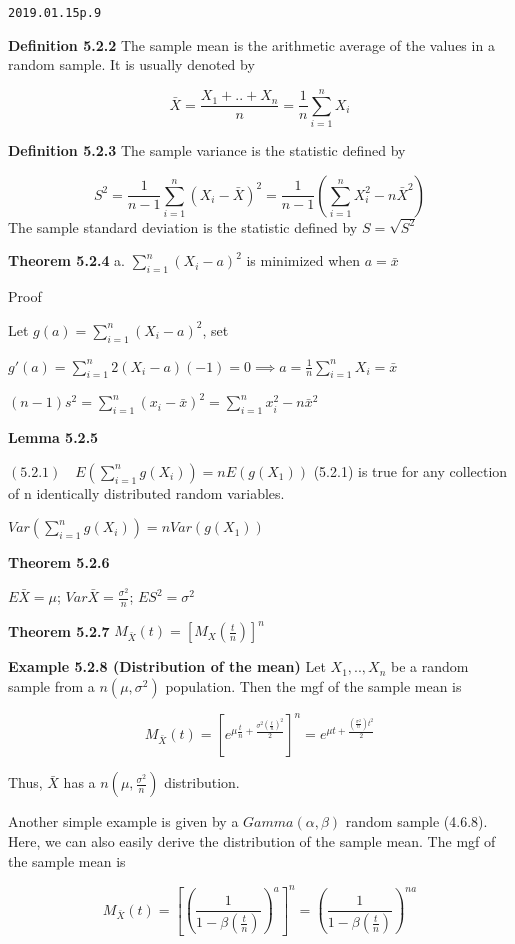 \documentclass[6pt,Portrait]{article}
\begin{document}
\texttt{2019.01.15\textasciigrave{}\textasciigrave{}p.9}

\textbf{Definition 5.2.2} The sample mean is the arithmetic average of
the values in a random sample. It is usually denoted by

\[\bar X=\frac{X_1+..+X_n}{n}=\frac1n\sum_{i=1}^nX_i\]

\textbf{Definition 5.2.3} The sample variance is the statistic defined
by

\[S^2=\frac1{n-1}\sum_{i=1}^n(X_i-\bar X)^2=\frac1{n-1}(\sum_{i=1}^nX_i^2-n\bar X^2)\]
The sample standard deviation is the statistic defined by
\(S=\sqrt{S^2}\)

\textbf{Theorem 5.2.4} a. \(\sum_{i=1}^n(X_i-a)^2\) is minimized when
\(a=\bar x\)

Proof

Let \(g(a)=\sum_{i=1}^n(X_i-a)^2\), set

\(g'(a)=\sum_{i=1}^n2(X_i-a)(-1)=0\implies a=\frac1n\sum_{i=1}^nX_i=\bar x\)

\((n-1)s^2=\sum_{i=1}^n(x_i-\bar x)^2=\sum_{i=1}^nx_i^2-n\bar x^2\)

\textbf{Lemma 5.2.5}

\((5.2.1)\quad E\left(\sum_{i=1}^ng(X_i) \right)=nE(g(X_1))\) (5.2.1) is
true for any collection of n identically distributed random variables.

\(Var\left(\sum_{i=1}^ng(X_i) \right)=nVar(g(X_1))\)

\textbf{Theorem 5.2.6}

\(E\bar X=\mu\); \(Var\bar X=\frac{\sigma^2}n\); \(ES^2=\sigma^2\)

\textbf{Theorem 5.2.7} \(M_{\bar X}(t)=[M_X(\frac{t}n)]^n\)

\textbf{Example 5.2.8 (Distribution of the mean)} Let \(X_1,..,X_n\) be
a random sample from a \(n(\mu,\sigma^2)\) population. Then the mgf of
the sample mean is

\[M_{\bar X}(t)=\left[e^{\mu\frac{t}n+\frac{\sigma^2{(\frac{t}n)}^2}2}\right]^n=e^{\mu t+\frac{(\frac{\sigma^2}{n})t^2}2}\]

Thus, \(\bar X\) has a \(n(\mu,\frac{\sigma^2}n)\) distribution.

Another simple example is given by a \(Gamma(\alpha,\beta)\) random
sample (4.6.8). Here, we can also easily derive the distribution of the
sample mean. The mgf of the sample mean is

\[M_{\bar X}(t)=\left[\left(\frac1{1-\beta(\frac{t}n)}\right)^{a}\right]^n=\left(\frac1{1-\beta(\frac{t}n)}\right)^{na}\]
\end{document}
